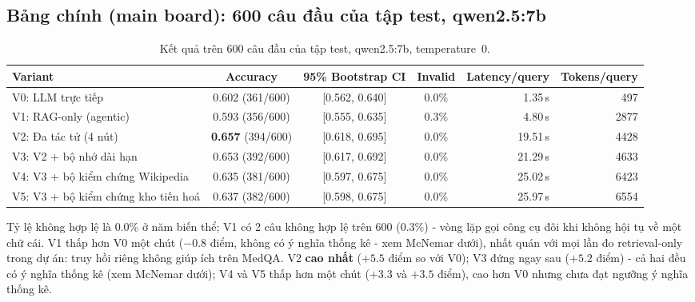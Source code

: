 \documentclass[11pt]{article}
\begin{document}
\subsection{Bảng chính (main board): 600 câu đầu của tập test, qwen2.5:7b}
\begin{table}[h]
  \centering
  \caption{Kết quả trên 600 câu đầu của tập test, qwen2.5:7b, temperature~0.}
  \label{tab:official}
  \small
  \begin{tabular}{@{}p{}cccrr@{}}
    \toprule
    Variant & Accuracy & 95\% Bootstrap CI & Invalid & Latency/query & Tokens/query \\
    \midrule
    V0: LLM trực tiếp & 0.602 (361/600) & [0.562, 0.640] & 0.0\% & 1.35\,s & 497 \\
    V1: RAG-only (agentic) & 0.593 (356/600) & [0.555, 0.635] & 0.3\% & 4.80\,s & 2877 \\
    V2: Đa tác tử (4 nút) & \textbf{0.657} (394/600) & [0.618, 0.695] & 0.0\% & 19.51\,s & 4428 \\
    V3: V2 + bộ nhớ dài hạn & 0.653 (392/600) & [0.617, 0.692] & 0.0\% & 21.29\,s & 4633 \\
    V4: V3 + bộ kiểm chứng Wikipedia & 0.635 (381/600) & [0.597, 0.675] & 0.0\% & 25.02\,s & 6423 \\
    V5: V3 + bộ kiểm chứng kho tiến hoá & 0.637 (382/600) & [0.598, 0.675] & 0.0\% & 25.97\,s & 6554 \\
    \bottomrule
  \end{tabular}
\end{table}
Tỷ lệ không hợp lệ là 0.0\% ở năm biến thể; V1 có 2 câu không hợp lệ trên 600 (0.3\%) - vòng lặp gọi
công cụ đôi khi không hội tụ về một chữ cái. V1 thấp hơn V0 một chút ($-0.8$ điểm, không có ý nghĩa
thống kê - xem McNemar dưới), nhất quán với mọi lần đo retrieval-only trong dự án: truy hồi riêng
không giúp ích trên MedQA. V2 \textbf{cao nhất} ($+5.5$ điểm so với V0); V3 đứng ngay sau ($+5.2$
điểm) - cả hai đều có ý nghĩa thống kê (xem McNemar dưới); V4 và V5 thấp hơn một chút ($+3.3$ và
$+3.5$ điểm), cao hơn V0 nhưng chưa đạt ngưỡng ý nghĩa thống kê.
\end{document}
